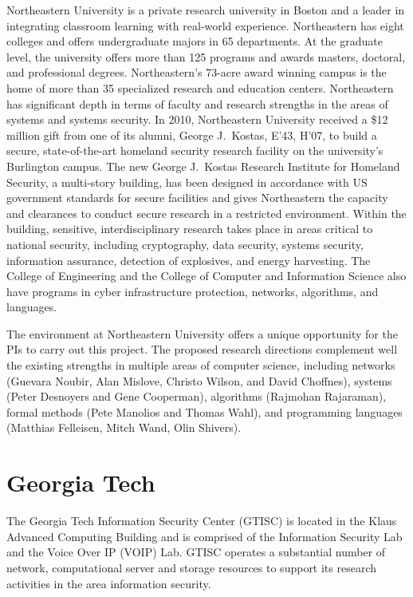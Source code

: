 \documentclass[letterpaper,twoside,11pt,headings=small]{scrartcl}
\begin{document}
Northeastern University is a private research university in Boston and a
leader in integrating classroom learning with real-world experience.
Northeastern has eight colleges and offers undergraduate majors in 65
departments. At the graduate level, the university offers more than 125
programs and awards masters, doctoral, and professional degrees.
Northeastern's 73-acre award winning campus is the home of more than 35
specialized research and education centers.  Northeastern has significant
depth in terms of faculty and research strengths in the areas of systems and
systems security. In 2010, Northeastern University received a \$12 million
gift from one of its alumni, George J.~Kostas, E'43, H'07, to build a secure,
state-of-the-art homeland security research facility on the university's
Burlington campus. The new George J.~Kostas Research Institute for Homeland
Security, a multi-story building, has been designed in accordance with US
government standards for secure facilities and gives Northeastern the capacity
and clearances to conduct secure research in a restricted environment. Within
the building, sensitive, interdisciplinary research takes place in areas
critical to national security, including cryptography, data security, systems
security, information assurance, detection of explosives, and energy
harvesting.  The College of Engineering and the College of Computer and
Information Science also have programs in cyber infrastructure protection,
networks, algorithms, and languages.

The environment at Northeastern University offers a unique opportunity for the
PIs to carry out this project.  The proposed research directions complement
well the existing strengths in multiple areas of computer science, including
networks (Guevara Noubir, Alan Mislove, Christo Wilson, and David Choffnes),
systems (Peter Desnoyers and Gene Cooperman), algorithms (Rajmohan Rajaraman),
formal methods (Pete Manolios and Thomas Wahl), and programming languages
(Matthias Felleisen, Mitch Wand, Olin Shivers).

\section*{Georgia Tech}

The Georgia Tech Information Security Center (GTISC) is located in the Klaus
Advanced Computing Building and is comprised of the Information Security Lab
and the Voice Over IP (VOIP) Lab.  GTISC operates a substantial number of
network, computational server and storage resources  to support its research
activities in the area information security.
\end{document}
